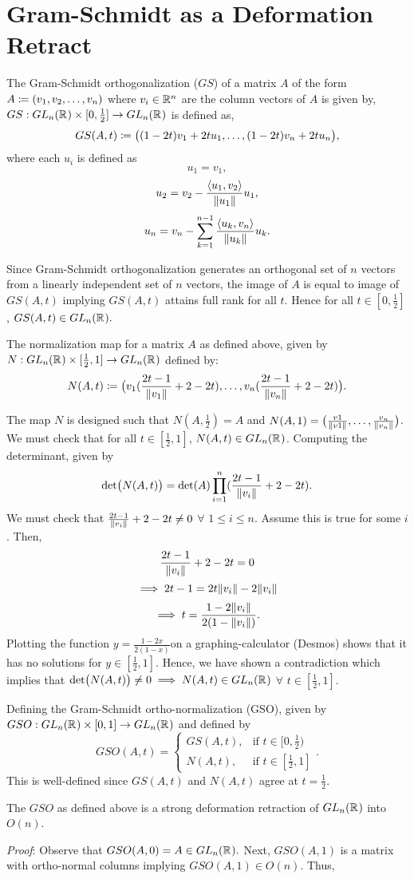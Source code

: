 \section{Gram-Schmidt as a Deformation Retract}
\label{s:deformation_retract}
\begin{definition}
The Gram-Schmidt orthogonalization ($GS$) of a matrix $A$ of the form $A \Let (v_1, v_2, \ldots , v_n)$ where $v_i \in \R[n]$ are the column vectors of $A$ is given by,
$GS: GL_n(\R) \times [0, \frac{1}{2}] \mapsto GL_n(\R)$ is defined as,
$$GS(A, t) \Let \bigl((1-2t)v_1 + 2tu_1, \ldots, (1-2t)v_n + 2tu_n\bigr),$$ where each $u_i$ is defined as
$$u_1 = v_1,$$
$$u_2 = v_2 - \frac{\innerprod{u_1, v_2}}{\norm{u_1}}u_1,$$
$$u_n = v_n - \sum_{k=1}^{n-1}\frac{\innerprod{u_k, v_n}}{\norm{u_k}}u_k.$$
\end{definition}
Since Gram-Schmidt orthogonalization generates an orthogonal set of $n$ vectors from a linearly independent set of $n$ vectors, the image of $A$ is equal to image of $GS(A, t)$ implying $GS(A, t)$ attains full rank for all $t$. Hence for all $t \in [0, \frac{1}{2}]$, $GS(A,t) \in GL_n(\R).$ 
\begin{definition}
The normalization map for a matrix $A$ as defined above, given by $N: GL_n(\R) \times [\frac{1}{2}, 1] \mapsto GL_n(\R)$ defined by:
$$N(A,t) \Let \bigl(v_1(\frac{2t-1}{\norm{v_1}} + 2 - 2t), \ldots , v_n(\frac{2t-1}{\norm{v_n}} + 2 - 2t)\bigr).$$
\end{definition}
The map $N$ is designed such that $N(A,\frac{1}{2}) = A$ and $N(A, 1) = \bigl(\frac{v1}{\norm{v1}}, \ldots ,\frac{v_n}{\norm{v_n}}\bigr)$. We must check that for all $t \in [\frac{1}{2},1]$, $N(A,t) \in GL_n(\R)$. Computing the determinant, given by
$$\mathrm{det}\bigl(N(A,t)\bigr) = \mathrm{det}(A)\prod_{i=1}^{n}(\frac{2t-1}{\norm{v_i}} + 2 - 2t).$$
We must check that $\frac{2t-1}{\norm{v_i}} + 2 - 2t \neq 0$ $\forall$ $1\leq i \leq n$. Assume this is true for some $i$. Then,
$$\frac{2t-1}{\norm{v_i}} + 2 - 2t = 0$$
$$\implies 2t - 1 = 2t\norm{v_i} - 2\norm{v_i}$$
$$\implies t = \frac{1 - 2\norm{v_i}}{2(1 - \norm{v_i})}.$$
Plotting the function $y = \frac{1-2x}{2(1-x)}$on a graphing-calculator (Desmos) shows that it has no solutions for $y \in [\frac{1}{2}, 1]$. Hence, we have shown a contradiction which implies that $\mathrm{det}\bigl(N(A,t)\bigr) \neq 0 \implies N(A,t) \in GL_n(\R)$ $\forall$ $t \in [\frac{1}{2},1].$ 

\begin{definition}
Defining the Gram-Schmidt ortho-normalization (GSO), given by $GSO: GL_n(\R) \times [0,1] \mapsto GL_n(\R)$ and defined by
\[
    GSO(A,t) = 
\begin{cases}
    GS(A,t),& \text{if } t\in [0, \frac{1}{2})\\
    N(A,t),& \text{if } t\in [\frac{1}{2}, 1]
\end{cases}.
\]
This is well-defined since $GS(A,t)$ and $N(A,t)$ agree at $t=\frac{1}{2}$.
\end{definition}

\begin{theorem}
The $GSO$ as defined above is a strong deformation retraction of $GL_n(\R)$ into $O(n)$.
\end{theorem}
\emph{Proof}: Observe that $GSO(A,0) = A \in GL_n(\R).$ Next, $GSO(A,1)$ is a matrix with ortho-normal columns implying $GSO(A,1) \in O(n)$. Thus, $$
